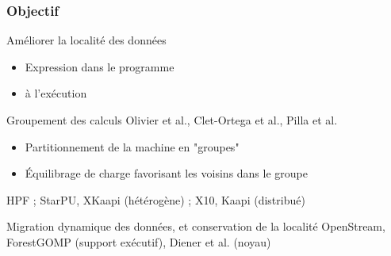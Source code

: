 \documentclass[xcolor={usenames,dvipsnames,svgnames,table}, aspectratio=43]{beamer}
\renewcommand{\emph}[1]{{\usebeamercolor[fg]{titlelike}#1}}
\begin{document}
\begin{frame}[fragile]
\end{frame}



\begin{frame}
  \frametitle{Objectif}
  \begin{exampleblock}{Améliorer la localité des données}
    \begin{itemize}
      \item Expression dans le programme
      \item à l'exécution
    \end{itemize}
  \end{exampleblock}
  \begin{block}{Groupement des calculs}
    Olivier et al., Clet-Ortega et al., Pilla et al.
    \begin{itemize}
      \item Partitionnement de la machine en "groupes"
      \item Équilibrage de charge favorisant les voisins dans le groupe
    \end{itemize}
  \end{block}

  \begin{block}{
  }
    HPF ;  StarPU, XKaapi (hétérogène) ; X10, Kaapi (distribué)
  \end{block}

  \begin{block}{Migration dynamique des données, et conservation de la localité}
    OpenStream, ForestGOMP (support exécutif), Diener et al. (noyau)
  \end{block}

\end{frame}
\end{document}
